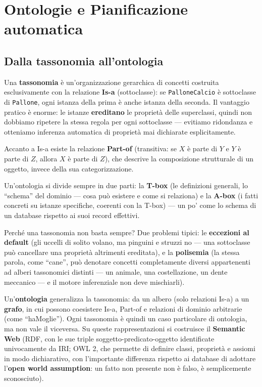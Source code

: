 \documentclass[11pt,a4paper]{article}
\begin{document}
\newpage
\section{Ontologie e Pianificazione automatica}

\subsection{Dalla tassonomia all'ontologia}

Una \textbf{tassonomia} è un'organizzazione gerarchica di concetti costruita esclusivamente con la relazione \textbf{Is-a} (sottoclasse): se \texttt{PalloneCalcio} è sottoclasse di \texttt{Pallone}, ogni istanza della prima è anche istanza della seconda. Il vantaggio pratico è enorme: le istanze \textbf{ereditano} le proprietà delle superclassi, quindi non dobbiamo ripetere la stessa regola per ogni sottoclasse --- evitiamo ridondanza e otteniamo inferenza automatica di proprietà mai dichiarate esplicitamente.

Accanto a Is-a esiste la relazione \textbf{Part-of} (transitiva: se $X$ è parte di $Y$ e $Y$ è parte di $Z$, allora $X$ è parte di $Z$), che descrive la composizione strutturale di un oggetto, invece della sua categorizzazione.

Un'ontologia si divide sempre in due parti: la \textbf{T-box} (le definizioni generali, lo ``schema'' del dominio --- cosa può esistere e come si relaziona) e la \textbf{A-box} (i fatti concreti su istanze specifiche, coerenti con la T-box) --- un po' come lo schema di un database rispetto ai suoi record effettivi.

Perché una tassonomia non basta sempre? Due problemi tipici: le \textbf{eccezioni al default} (gli uccelli di solito volano, ma pinguini e struzzi no --- una sottoclasse può cancellare una proprietà altrimenti ereditata), e la \textbf{polisemia} (la stessa parola, come ``cane'', può denotare concetti completamente diversi appartenenti ad alberi tassonomici distinti --- un animale, una costellazione, un dente meccanico --- e il motore inferenziale non deve mischiarli).

Un'\textbf{ontologia} generalizza la tassonomia: da un albero (solo relazioni Is-a) a un \textbf{grafo}, in cui possono coesistere Is-a, Part-of e relazioni di dominio arbitrarie (come ``haMoglie''). Ogni tassonomia è quindi un caso particolare di ontologia, ma non vale il viceversa. Su queste rappresentazioni si costruisce il \textbf{Semantic Web} (RDF, con le sue triple soggetto-predicato-oggetto identificate univocamente da IRI; OWL 2, che permette di definire classi, proprietà e assiomi in modo dichiarativo, con l'importante differenza rispetto ai database di adottare l'\textbf{open world assumption}: un fatto non presente non è falso, è semplicemente sconosciuto).
\end{document}

